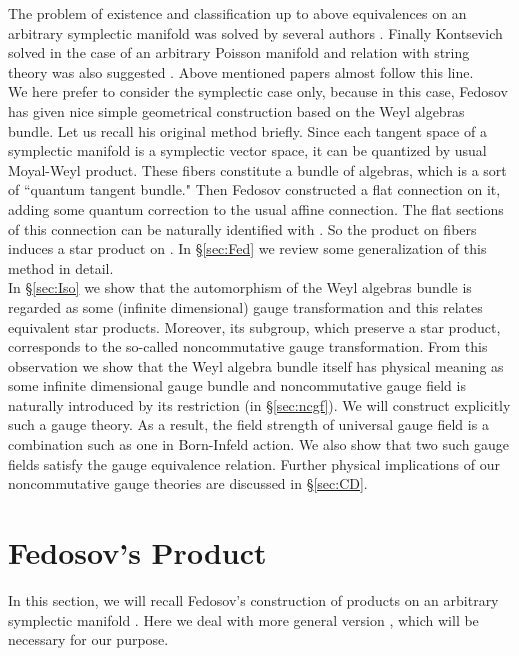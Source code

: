 \documentclass[10pt,a4paper]{article}
\def\h{\hbar}
\begin{document}
The problem of existence and classification up to above equivalences on an arbitrary symplectic manifold was solved by several authors \cite{BFFLS}\cite{DWL}. Finally Kontsevich \cite{Ko} solved in the case of an arbitrary Poisson manifold and relation with string theory was also suggested \cite{CF}. Above mentioned papers almost follow this line.\\

We here prefer to consider the symplectic case only, because in this case, Fedosov \cite{Fed}\cite{Fedbk} has given nice simple geometrical construction based on the Weyl algebras bundle. Let us recall his original method \cite{Fed} briefly. Since each tangent space of a symplectic manifold is a symplectic vector space, it can be quantized by usual Moyal-Weyl product. These fibers constitute a bundle of algebras, which is a sort of ``quantum tangent bundle." Then Fedosov constructed a flat connection on it, adding some quantum correction to the usual affine connection.  The flat sections of this connection can be naturally identified with \myHighlight{$Z=C^\infty(M)[[\h]]$}\coordHE{}. So the product on fibers induces a star product on \coordHE{}. In \S\ref{sec:Fed} we review some generalization of this method in detail.\\

In \S\ref{sec:Iso} we show that the automorphism of the Weyl algebras bundle is regarded as some (infinite dimensional) gauge transformation and this relates equivalent star products. Moreover, its subgroup, which preserve a star product, corresponds to the so-called noncommutative gauge transformation. From this observation we show that the Weyl algebra bundle itself has physical meaning as some infinite dimensional gauge bundle and noncommutative gauge field is naturally introduced by its restriction (in \S\ref{sec:ncgf}). We will construct explicitly such a gauge theory. As a result, the field strength of universal gauge field is a combination such as one in Born-Infeld action.  We also show that two such gauge fields satisfy the gauge equivalence relation. 
Further physical implications of our noncommutative gauge theories are discussed in \S\ref{sec:CD}.\\


\section{Fedosov's \myHighlight{$*$}\coordHE{} Product
\label{sec:Fed}}

In this section, we will recall Fedosov's construction of \myHighlight{$*$}\coordHE{} products on an arbitrary symplectic manifold \cite{Fed}\cite{Fedbk}. Here we deal with more general version \cite{Fedbk}, which will be necessary for our purpose.
\end{document}

